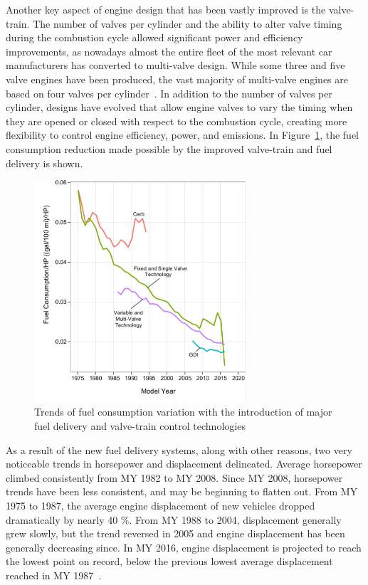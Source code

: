 Another key aspect of engine design that has been vastly improved is the valve-train. The number of valves per cylinder and the ability to alter valve timing during the combustion cycle allowed significant power and efficiency improvements, as nowadays almost the entire fleet of the most relevant car manufacturers has converted to multi-valve design. While some three and five valve engines have been produced, the vast majority of multi-valve engines are based on four valves per cylinder~\cite{EPA2016}. In addition to the number of valves per cylinder, designs have evolved that allow engine valves to vary the timing when they are opened or closed with respect to the combustion cycle, creating more flexibility to control engine efficiency, power, and emissions. In Figure~\ref{fig:improvement_valve_fuel_delivery}, the fuel consumption reduction made possible by the improved valve-train and fuel delivery is shown. 

\begin{figure}[ht]
  \centering
  \includegraphics[width=0.7\textwidth]{figures/review/improvement_valve_fuel_delivery.pdf}
  \caption{Trends of fuel consumption variation with the introduction of major fuel delivery and valve-train control technologies \label{fig:improvement_valve_fuel_delivery} }
\end{figure}

As a result of the new fuel delivery systems, along with other reasons, two very noticeable trends in horsepower and displacement delineated. Average horsepower climbed consistently from MY 1982 to MY 2008. Since MY 2008, horsepower trends have been less consistent, and may be beginning to flatten out. From MY 1975 to 1987, the average engine displacement of new vehicles dropped dramatically by nearly 40 \%. From MY 1988 to 2004, displacement generally grew slowly, but the trend reversed in 2005 and engine displacement has been generally decreasing since. In MY 2016, engine displacement is projected to reach the lowest point on record, below the previous lowest average displacement reached in MY 1987~\cite{EPA2016}.


